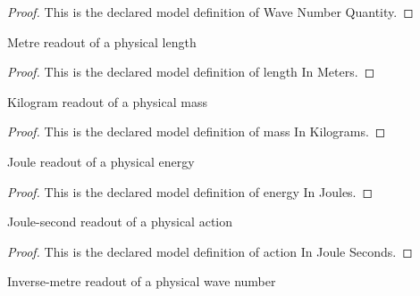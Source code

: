 \begin{proof}
  This is the declared model definition of Wave Number Quantity.
\end{proof}
\begin{definition}
  \label{def:physics:phyx-mini-0617:phyxminiproblems-problemphyxmini0617-lengthinmeters}
  Metre readout of a physical length
\end{definition}
\begin{proof}
  This is the declared model definition of length In Meters.
\end{proof}
\begin{definition}
  \label{def:physics:phyx-mini-0617:phyxminiproblems-problemphyxmini0617-massinkilograms}
  Kilogram readout of a physical mass
\end{definition}
\begin{proof}
  This is the declared model definition of mass In Kilograms.
\end{proof}
\begin{definition}
  \label{def:physics:phyx-mini-0617:phyxminiproblems-problemphyxmini0617-energyinjoules}
  Joule readout of a physical energy
\end{definition}
\begin{proof}
  This is the declared model definition of energy In Joules.
\end{proof}
\begin{definition}
  \label{def:physics:phyx-mini-0617:phyxminiproblems-problemphyxmini0617-actioninjouleseconds}
  Joule-second readout of a physical action
\end{definition}
\begin{proof}
  This is the declared model definition of action In Joule Seconds.
\end{proof}
\begin{definition}
  \label{def:physics:phyx-mini-0617:phyxminiproblems-problemphyxmini0617-wavenumberininversemeters}
  Inverse-metre readout of a physical wave number
\end{definition}
